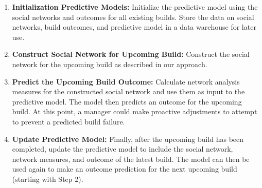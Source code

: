 % 




\begin{enumerate}
\item \textbf{Initialization Predictive Models:}
Initialize the predictive model using the social networks and
outcomes for all existing builds. Store the data on social networks, build
outcomes, and predictive model in a data warehouse for later use.
\item \textbf{Construct Social Network for Upcoming Build:}
Construct the social network for the upcoming build as described
in our approach.
\item \textbf{Predict the Upcoming Build Outcome:}
Calculate network analysis measures for the constructed social
network and use them as input to the predictive model. The model then predicts
an outcome for the upcoming build. At this point, a manager could make
proactive adjustments to attempt to prevent a predicted build failure.
\item \textbf{Update Predictive Model:}
Finally, after the upcoming build has been completed, update the predictive
model to include the social network, network measures, and outcome of the latest
build. The model can then be used again to make an outcome prediction for the
next upcoming build (starting with Step 2).
\end{enumerate}



